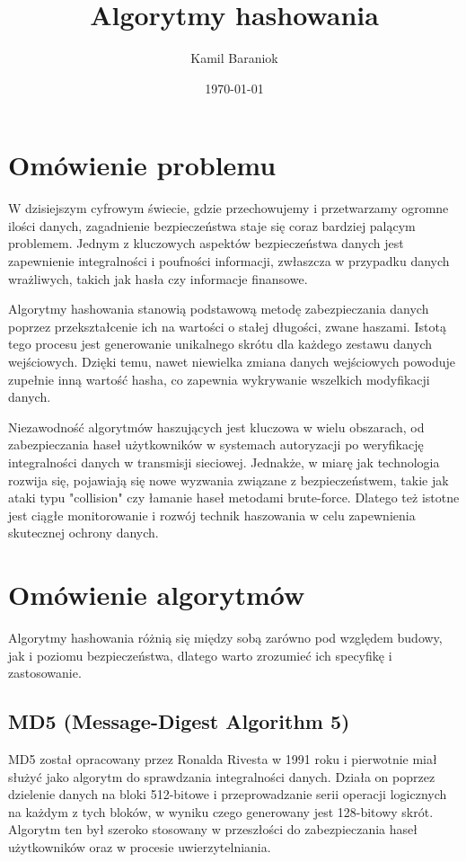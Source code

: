 \documentclass[10pt,a4paper]{article}
\author{Kamil Baraniok}
\title{Algorytmy hashowania}
\date{\today}
\begin{document}
\maketitle

\section{Omówienie problemu}
W dzisiejszym cyfrowym świecie, gdzie przechowujemy i przetwarzamy ogromne ilości danych, zagadnienie bezpieczeństwa staje się coraz bardziej palącym problemem. Jednym z kluczowych aspektów bezpieczeństwa danych jest zapewnienie integralności i poufności informacji, zwłaszcza w przypadku danych wrażliwych, takich jak hasła czy informacje finansowe.

Algorytmy hashowania stanowią podstawową metodę zabezpieczania danych poprzez przekształcenie ich na wartości o stałej długości, zwane haszami. Istotą tego procesu jest generowanie unikalnego skrótu dla każdego zestawu danych wejściowych. Dzięki temu, nawet niewielka zmiana danych wejściowych powoduje zupełnie inną wartość hasha, co zapewnia wykrywanie wszelkich modyfikacji danych.

Niezawodność algorytmów haszujących jest kluczowa w wielu obszarach, od zabezpieczania haseł użytkowników w systemach autoryzacji po weryfikację integralności danych w transmisji sieciowej. Jednakże, w miarę jak technologia rozwija się, pojawiają się nowe wyzwania związane z bezpieczeństwem, takie jak ataki typu "collision" czy łamanie haseł metodami brute-force. Dlatego też istotne jest ciągłe monitorowanie i rozwój technik haszowania w celu zapewnienia skutecznej ochrony danych.

\section{Omówienie algorytmów}
Algorytmy hashowania różnią się między sobą zarówno pod względem budowy, jak i poziomu bezpieczeństwa, dlatego warto zrozumieć ich specyfikę i zastosowanie.

\subsection{MD5 (Message-Digest Algorithm 5)}
MD5 został opracowany przez Ronalda Rivesta w 1991 roku i pierwotnie miał służyć jako algorytm do sprawdzania integralności danych. Działa on poprzez dzielenie danych na bloki 512-bitowe i przeprowadzanie serii operacji logicznych na każdym z tych bloków, w wyniku czego generowany jest 128-bitowy skrót. Algorytm ten był szeroko stosowany w przeszłości do zabezpieczania haseł użytkowników oraz w procesie uwierzytelniania.
\end{document}

